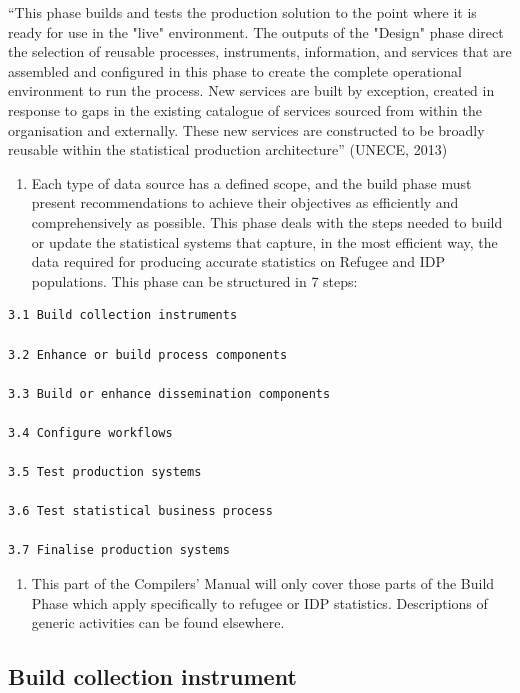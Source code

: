 \documentclass[
]{article}
\providecommand{\tightlist}{%
  \setlength{\itemsep}{0pt}\setlength{\parskip}{0pt}}
\begin{document}
``This phase builds and tests the production solution to the point where
it is ready for use in the "live" environment. The outputs of the
"Design" phase direct the selection of reusable processes,
instruments, information, and services that are assembled and configured
in this phase to create the complete operational environment to run the
process. New services are built by exception, created in response to
gaps in the existing catalogue of services sourced from within the
organisation and externally. These new services are constructed to be
broadly reusable within the statistical production architecture'' (UNECE,
2013)

\begin{enumerate}
\def\labelenumi{\arabic{enumi}.}
\setcounter{enumi}{292}
\tightlist
\item
  Each type of data source has a defined scope, and the build phase
  must present recommendations to achieve their objectives as
  efficiently and comprehensively as possible. This phase deals with
  the steps needed to build or update the statistical systems that
  capture, in the most efficient way, the data required for producing
  accurate statistics on Refugee and IDP populations. This phase can
  be structured in 7 steps:
\end{enumerate}

\begin{verbatim}
3.1 Build collection instruments

3.2 Enhance or build process components

3.3 Build or enhance dissemination components

3.4 Configure workflows

3.5 Test production systems

3.6 Test statistical business process

3.7 Finalise production systems
\end{verbatim}

\begin{enumerate}
\def\labelenumi{\arabic{enumi}.}
\setcounter{enumi}{293}
\tightlist
\item
  This part of the Compilers' Manual will only cover those parts of
  the Build Phase which apply specifically to refugee or IDP
  statistics. Descriptions of generic activities can be found
  elsewhere.
\end{enumerate}

\hypertarget{build-collection-instrument}{%
\subsection{Build collection instrument}\label{build-collection-instrument}}
\end{document}
